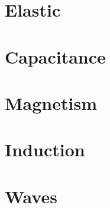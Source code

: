 \documentclass[a4paper,english]{report}    %
\begin{document}
\graphicspath{{./}{TemperatureAngleGUI/}}


\graphicspath{{./}{TemperatureGeneric/}}


\part{Elastic}
\graphicspath{{./}{ElasticBeamGUI/}}


\graphicspath{{./}{ElasticBeam3D/}}


\graphicspath{{./}{ElasticHookNonlinear/}}


\graphicspath{{./}{ElasticPlateEigenmodesGUI/}}


\part{Capacitance}
\graphicspath{{./}{FringeCapacitance/}}


\graphicspath{{./}{CapacitanceOfTwoBalls/}}


\graphicspath{{./}{CapacitanceOfPerforatedPlate/}}


\part{Magnetism}

\graphicspath{{./}{MagneticFieldWire/}}


\graphicspath{{./}{HorseShoeGUI/}}


\part{Induction}

\graphicspath{{./}{InductionHeatingGUI/}}


\part{Waves}
\end{document}
